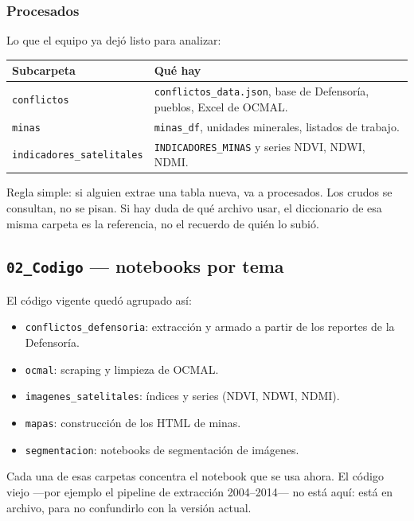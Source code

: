 \documentclass[11pt,a4paper]{article}
\begin{document}
\subsubsection{Procesados}

Lo que el equipo ya dejó listo para analizar:

\begin{center}
\renewcommand{\arraystretch}{1.2}
\begin{tabularx}{\textwidth}{@{}l Y@{}}
\toprule
\textbf{Subcarpeta} & \textbf{Qué hay} \\
\midrule
\texttt{conflictos} & \texttt{conflictos\_data.json}, base de Defensoría, pueblos, Excel de OCMAL. \\
\texttt{minas} & \texttt{minas\_df}, unidades minerales, listados de trabajo. \\
\texttt{indicadores\_satelitales} & \texttt{INDICADORES\_MINAS} y series NDVI, NDWI, NDMI. \\
\bottomrule
\end{tabularx}
\end{center}

Regla simple: si alguien extrae una tabla nueva, va a procesados. Los crudos se consultan, no se pisan. Si hay duda de qué archivo usar, el diccionario de esa misma carpeta es la referencia, no el recuerdo de quién lo subió.

\subsection{\texttt{02\_Codigo} --- notebooks por tema}

El código vigente quedó agrupado así:

\begin{itemize}
  \item \texttt{conflictos\_defensoria}: extracción y armado a partir de los reportes de la Defensoría.
  \item \texttt{ocmal}: scraping y limpieza de OCMAL.
  \item \texttt{imagenes\_satelitales}: índices y series (NDVI, NDWI, NDMI).
  \item \texttt{mapas}: construcción de los HTML de minas.
  \item \texttt{segmentacion}: notebooks de segmentación de imágenes.
\end{itemize}

Cada una de esas carpetas concentra el notebook que se usa ahora. El código viejo ---por ejemplo el pipeline de extracción 2004--2014--- no está aquí: está en archivo, para no confundirlo con la versión actual.
\end{document}
